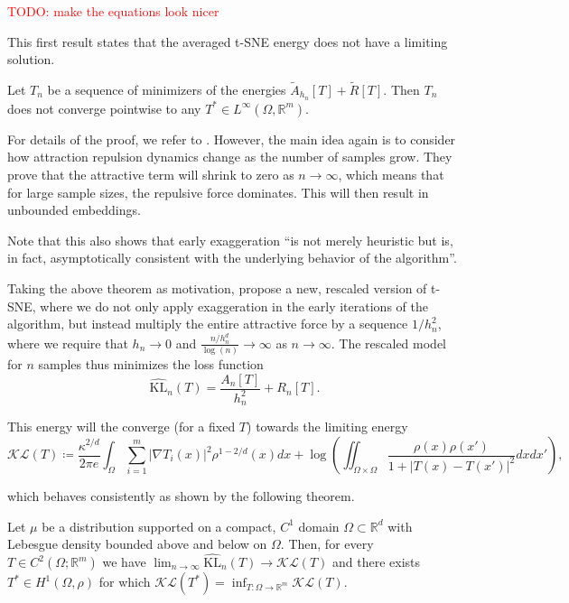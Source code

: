 \textcolor{red}{TODO: make the equations look nicer}

This first result states that the averaged t-SNE energy does not have a limiting solution. 
\begin{thm}
    Let $T_n$ be a sequence of minimizers of the energies $\tilde{A}_{h_n}[T] + \tilde{R}[T]$. Then $T_n$ does not converge pointwise to any $T^* \in L^\infty(\Omega, \mathbb{R}^m)$. 
\end{thm}

For details of the proof, we refer to \cite{murray2024largedatalimitsscaling}. However, the main idea again is to consider how attraction repulsion dynamics change as the number of samples grow. 
They prove that the attractive term will shrink to zero as $n \to \infty$, which means that for large sample sizes, the repulsive force dominates. This will then result in unbounded embeddings. 

Note that this also shows that early exaggeration \enquote{is not merely heuristic but is, in fact, asymptotically consistent with the underlying behavior of the algorithm}.

Taking the above theorem as motivation, \cite{murray2024largedatalimitsscaling} propose a new, rescaled version of t-SNE, where we do not only apply exaggeration in the early iterations of the algorithm, but instead multiply the entire attractive force by a sequence $1/h_n^2$, where we  require that $h_n \to 0$ and $\frac{n /h_n^d}{\log(n)} \to \infty$ as $n \to \infty$. 
The rescaled model for $n$ samples thus minimizes the loss function 
\begin{equation}
    \hat{\text{KL}}_n(T) = \frac{A_n [T]}{h_n^2} + R_n[T].
\end{equation}

This energy will the converge (for a fixed $T$) towards the limiting energy 
\begin{equation}
    \mathcal{K}\mathcal{L} (T) \coloneq \frac{\kappa^{2/d}}{2 \pi e} \int_\Omega \sum_{i=1}^m |\nabla T_i(x)|^2 \rho^{1-2/d} (x) d x + \log\left( \iint_{\Omega \times \Omega} \frac{\rho(x)\rho(x')}{1+ |T(x)-T(x')|^2}  d x d x' \right), 
\end{equation}

which behaves consistently as shown by the following theorem. 

\begin{thm}
    Let $\mu$ be a distribution supported on a compact, $C^1$ domain $\Omega \subset \mathbb{R}^d$ with Lebesgue density bounded above and below on $\Omega$. 
    Then, for every $T \in C^2(\Omega; \mathbb{R}^m)$ we have $\lim_{n \to \infty} \hat{\text{KL}}_n(T) \to \mathcal{K}\mathcal{L} (T)$
    and there exists $T^* \in H^1(\Omega, \rho)$ for which $\mathcal{K}\mathcal{L} (T^*) = \inf_{T: \Omega \to \mathbb{R}^m} \mathcal{K}\mathcal{L} (T)$.  
\end{thm}

